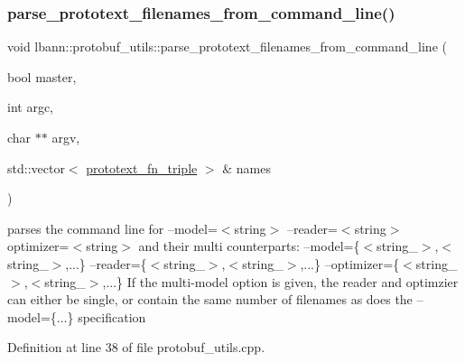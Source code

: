 \subsubsection{\texorpdfstring{parse\+\_\+prototext\+\_\+filenames\+\_\+from\+\_\+command\+\_\+line()}{parse\_prototext\_filenames\_from\_command\_line()}}
{\footnotesize\ttfamily void lbann\+::protobuf\+\_\+utils\+::parse\+\_\+prototext\+\_\+filenames\+\_\+from\+\_\+command\+\_\+line (\begin{DoxyParamCaption}\item[{bool}]{master,  }\item[{int}]{argc,  }\item[{char $\ast$$\ast$}]{argv,  }\item[{std\+::vector$<$ \hyperlink{structlbann_1_1prototext__fn__triple}{prototext\+\_\+fn\+\_\+triple} $>$ \&}]{names }\end{DoxyParamCaption})\hspace{0.3cm}{\ttfamily [static]}}

parses the command line for --model=$<$string$>$ --reader=$<$string$>$ optimizer=$<$string$>$ and their multi counterparts\+: --model=\{$<$string\+\_$>$,$<$string\+\_$>$,...\} --reader=\{$<$string\+\_$>$,$<$string\+\_$>$,...\} --optimizer=\{$<$string\+\_$>$,$<$string\+\_$>$,...\} If the multi-\/model option is given, the reader and optimzier can either be single, or contain the same number of filenames as does the --model=\{...\} specification 

Definition at line 38 of file protobuf\+\_\+utils.\+cpp.


